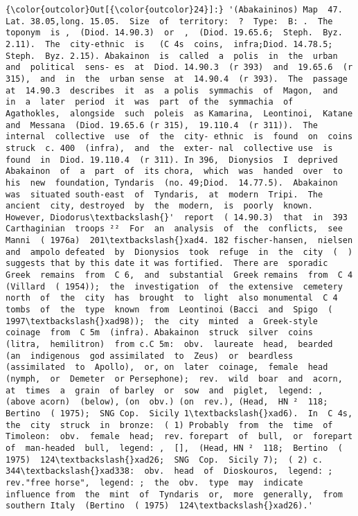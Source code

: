 \documentclass[11pt]{article}
\begin{document}
            \begin{Verbatim}[commandchars=\\\{\}]
{\color{outcolor}Out[{\color{outcolor}24}]:} '(Abakaininos) Map  47.  Lat. 38.05,long. 15.05.  Size  of  territory:  ?  Type:  B: .  The  toponym  is ,  (Diod. 14.90.3)  or  ,  (Diod. 19.65.6;  Steph.  Byz. 2.11).  The  city-ethnic  is   (C 4s  coins,  infra;Diod. 14.78.5;  Steph.  Byz. 2.15). Abakainon  is  called  a  polis  in  the  urban  and  political  sens- es  at  Diod. 14.90.3  (r 393)  and  19.65.6  (r 315),  and  in  the  urban sense  at  14.90.4  (r 393).  The  passage  at  14.90.3  describes  it  as  a polis  symmachis  of  Magon,  and  in  a  later  period  it  was  part  of the  symmachia  of  Agathokles,  alongside  such  poleis  as Kamarina,  Leontinoi,  Katane  and  Messana  (Diod. 19.65.6 (r 315),  19.110.4  (r 311)).  The  internal  collective  use  of  the  city- ethnic  is  found  on  coins  struck  c. 400  (infra),  and  the  exter- nal  collective use  is  found  in  Diod. 19.110.4  (r 311). In 396,  Dionysios  I  deprived  Abakainon  of  a  part  of  its chora,  which  was  handed  over  to  his  new  foundation, Tyndaris  (no. 49;Diod.  14.77.5).  Abakainon  was  situated south-east  of  Tyndaris,  at  modern  Tripi.  The  ancient  city, destroyed  by  the  modern,  is  poorly  known.  However, Diodorus\textbackslash{}'  report  ( 14.90.3)  that  in  393  Carthaginian  troops ²²  For  an  analysis  of  the  conflicts,  see  Manni  ( 1976a)  201\textbackslash{}xad4. 182 fischer-hansen,  nielsen  and  ampolo defeated  by  Dionysios  took  refuge  in  the  city  (  ) suggests that by this date it was fortified.  There are  sporadic  Greek  remains  from  C 6,  and  substantial  Greek remains  from  C 4  (Villard  ( 1954));  the  investigation  of  the extensive  cemetery  north  of  the  city  has  brought  to  light  also monumental  C 4  tombs  of  the  type  known  from  Leontinoi (Bacci  and  Spigo  ( 1997\textbackslash{}xad98));  the  city  minted  a  Greek-style coinage  from  C 5m  (infra). Abakainon  struck  silver  coins  (litra,  hemilitron)  from c.C 5m:  obv.  laureate  head,  bearded  (an  indigenous  god assimilated  to  Zeus)  or  beardless  (assimilated  to  Apollo),  or, on  later  coinage,  female  head  (nymph,  or  Demeter  or Persephone);  rev.  wild  boar  and  acorn,  at  times  a  grain  of barley  or  sow  and  piglet,  legend: ,  (above acorn)  (below), (on  obv.) (on  rev.), (Head,  HN ²  118;  Bertino  ( 1975);  SNG Cop.  Sicily 1\textbackslash{}xad6).  In  C 4s,  the  city  struck  in  bronze:  ( 1) Probably  from  the  time  of  Timoleon:  obv.  female  head;  rev. forepart  of  bull,  or  forepart  of  man-headed  bull,  legend: ,  [],  (Head, HN ²  118;  Bertino  ( 1975)  124\textbackslash{}xad26;  SNG  Cop.  Sicily 7);  ( 2) c. 344\textbackslash{}xad338:  obv.  head  of  Dioskouros,  legend: ;  rev."free horse",  legend: ;  the  obv.  type  may  indicate  influence from  the  mint  of  Tyndaris  or,  more  generally,  from  southern Italy  (Bertino  ( 1975)  124\textbackslash{}xad26).'
\end{Verbatim}
        
\end{document}
